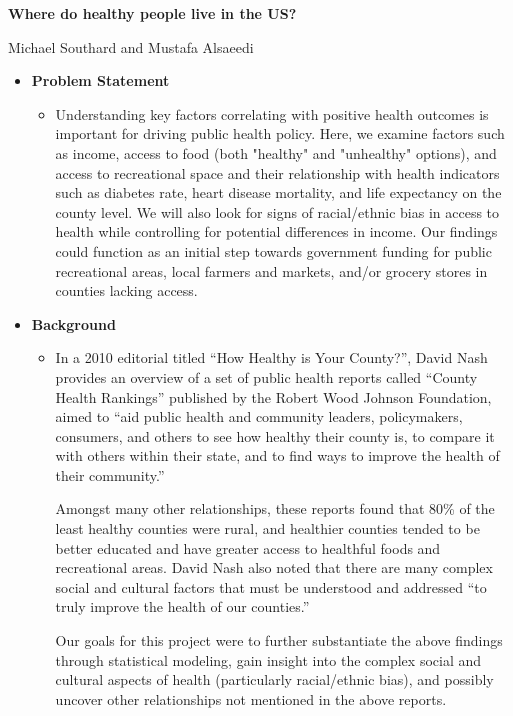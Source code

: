 \documentclass{article}
\begin{document}
\clearpage\thispagestyle{empty}
\centering
\vspace{1cm}

\textbf{Where do healthy people live in the US?}

Michael Southard and Mustafa Alsaeedi

\begin{itemize}[leftmargin=0pt]
\item[] \textbf{Problem Statement}
\begin{itemize}
    \item[] Understanding key factors correlating with positive health outcomes is important for driving public health policy. Here, we examine factors such as income, access to food (both "healthy" and "unhealthy" options), and access to recreational space and their relationship with health indicators such as diabetes rate, heart disease mortality, and life expectancy on the county level. We will also look for signs of racial/ethnic bias in access to health while controlling for potential differences in income. Our findings could function as an initial step towards government funding for public recreational areas, local farmers and markets, and/or grocery stores in counties lacking access.
\end{itemize}

\item[] \textbf{Background} 
\begin{itemize}
    \item[] In a 2010 editorial titled “How Healthy is Your County?”\cite{nash2010how}, David Nash provides an overview of a set of public health reports called “County Health Rankings”\cite{rwjf2010how} published by the Robert Wood Johnson Foundation, aimed to “aid public health and community leaders, policymakers, consumers, and others to see how healthy their county is, to compare it with others within their state, and to find ways to improve the health of their community.” 

    Amongst many other relationships, these reports found that 80\% of the least healthy counties were rural\cite{trapp2010health}, and healthier counties tended to be better educated and have greater access to healthful foods and recreational areas. David Nash also noted that there are many complex social and cultural factors that must be understood and addressed “to truly improve the health of our counties.”\cite{nash2010how}  

    Our goals for this project were to further substantiate the above findings through statistical modeling, gain insight into the complex social and cultural aspects of health (particularly racial/ethnic bias), and possibly uncover other relationships not mentioned in the above reports.  


\end{itemize}
\end{itemize}
\end{document}
